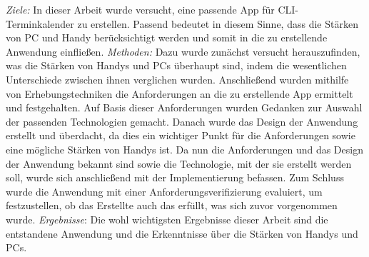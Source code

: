 %
%
%
	\textit{Ziele:} In dieser Arbeit wurde versucht, eine passende App für CLI-Terminkalender zu erstellen. \glqq Passend\grqq{} bedeutet in diesem Sinne, dass die Stärken von PC und Handy berücksichtigt werden und somit in die zu erstellende Anwendung einfließen.
	\newline%
	\myNewSection
	\textit{Methoden:} Dazu wurde zunächst versucht herauszufinden, was die Stärken von Handys und PCs überhaupt sind, indem die wesentlichen Unterschiede zwischen ihnen verglichen wurden.
	Anschließend wurden mithilfe von Erhebungstechniken die Anforderungen an die zu erstellende App ermittelt und festgehalten.
	Auf Basis dieser Anforderungen wurden Gedanken zur Auswahl der passenden Technologien gemacht. 
	Danach wurde das Design der Anwendung erstellt und überdacht, da dies ein wichtiger Punkt für die Anforderungen sowie eine mögliche Stärken von Handys ist.
	Da nun die Anforderungen und das Design der Anwendung bekannt sind sowie die Technologie, mit der sie erstellt werden soll, wurde sich anschließend mit der Implementierung befassen.
	Zum Schluss wurde die Anwendung mit einer Anforderungsverifizierung evaluiert, um festzustellen, ob das Erstellte auch das erfüllt, was sich zuvor vorgenommen wurde.
\newline%
\myNewSection
\textit{Ergebnisse}:
Die wohl wichtigsten Ergebnisse dieser Arbeit sind die entstandene Anwendung und die Erkenntnisse über die Stärken von Handys und PCs. 
	\newline
